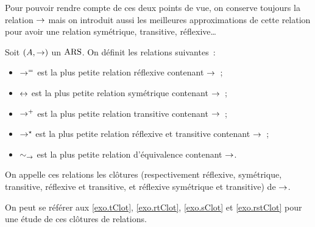 Pour pouvoir rendre compte de ces deux points de vue, on conserve toujours la
relation $\mathrel{\to}$ mais on introduit aussi les meilleures approximations de
cette relation pour avoir une relation symétrique, transitive, réflexive\ldots

\begin{definition}
  Soit $(A,\mathrel{\to})$ un $\operatorname{ARS}$. On définit les relations suivantes~:
  \begin{itemize}
  \item $\mathrel{\to}^{\mathord{=}}$ est la plus petite relation réflexive contenant $\mathrel{\to}$~;
  \item $\mathrel{\leftrightarrow}$ est la plus petite relation symétrique contenant $\mathrel{\to}$~;
  \item $\mathrel{\to}^{\mathord{+}}$ est la plus petite relation transitive contenant $\mathrel{\to}$~;
  \item $\mathrel{\to}^{\mathord{\star}}$ est la plus petite relation réflexive et transitive
    contenant $\mathrel{\to}$~;
  \item $\sim_{\mathord{\mathrel{\to}}}$ est la plus petite relation d'équivalence contenant
    $\mathrel{\to}$.
  \end{itemize}
  On appelle ces relations les clôtures (respectivement réflexive, symétrique,
  transitive, réflexive et transitive, et réflexive symétrique et transitive)
  de $\mathrel{\to}$.
\end{definition}

\begin{remark}
  On peut se référer aux \cref{exo.tClot}, \cref{exo.rtClot}, \cref{exo.sClot}
  et \cref{exo.rstClot} pour une étude de ces clôtures de relations.
\end{remark}

